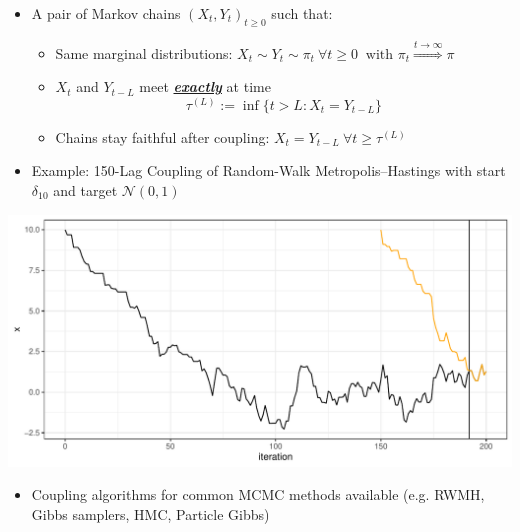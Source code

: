 \documentclass[landscape,a0b,final,a4resizeable]{a0poster}
\newenvironment{poster}{
  \begin{center}
  \begin{minipage}[c]{0.96\textwidth}
}{
  \end{minipage} 
  \end{center}
}
\theoremstyle{definition}
\theoremstyle{remark}
\begin{document}
\begin{poster}
\begin{multicols}{3}
{\Large \begin{itemize}
\item A pair of Markov chains \((X_t, Y_t)_{t \geq 0}\) such that:
\begin{itemize}
\item Same marginal distributions: 
\( X_t \sim Y_t \sim \pi_t \ \forall t \geq 0 \ \text{ with } \pi_t \overset{t \rightarrow \infty}{\Rightarrow} \pi \)
\item \(X_t\) and \(Y_{t-L}\) meet \textit{\underline{\textbf{exactly}}} at time 
\begin{equation}
\tau^{(L)}:= \inf \{ t > L : X_t = Y_{t-L} \}  \nonumber
\end{equation}
\item Chains stay faithful after coupling: \(X_t = Y_{t-L} \ \forall t \geq \tau^{(L)} \)
\end{itemize}
\end{itemize}}

\vspace{1\baselineskip}
{\Large \begin{itemize}
\item Example: 150-Lag Coupling of Random-Walk Metropolis--Hastings with start \(\delta_{10}\) and target \(\mathcal{N}(0,1)\)
\end{itemize}}

\vspace{1\baselineskip}

\begin{center}
\includegraphics[width=0.25\paperwidth]{../misc/rwmh_standard_normal_lag_150_trajectory.pdf}
\end{center}

\vspace{1\baselineskip}

{\Large \begin{itemize}
\item Coupling algorithms for common MCMC methods available (e.g. RWMH, Gibbs samplers, HMC, Particle Gibbs)
\end{itemize}}


\end{multicols}
\end{poster}
\end{document}
